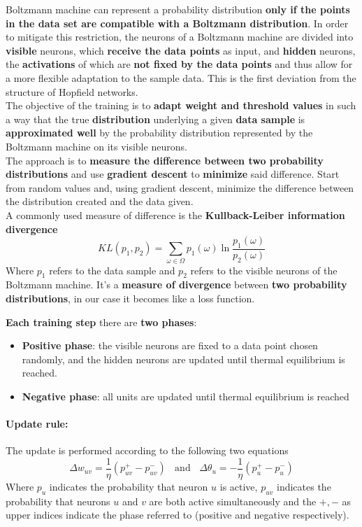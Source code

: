 Boltzmann machine can represent a probability distribution \textbf{only if the points in the data set are compatible with a Boltzmann distribution}. In order to mitigate this restriction, the neurons of a Boltzmann machine are divided into \textbf{visible} neurons, which \textbf{receive the data points} as input, and \textbf{hidden} neurons, the \textbf{activations} of which are \textbf{not fixed by the data points} and thus allow for a more flexible adaptation to the sample data. This is the first deviation from the structure of Hopfield networks.\\

The objective of the training is to \textbf{adapt weight and threshold values} in such a way that the true \textbf{distribution} underlying a given \textbf{data sample} is \textbf{approximated well} by the probability distribution represented by the Boltzmann machine on its visible neurons.\\

The approach is to \textbf{measure the difference between two probability distributions} and use \textbf{gradient descent} to \textbf{minimize} said difference. Start from random values and, using gradient descent, minimize the difference between the distribution created and the data given.\\

A commonly used measure of difference is the \textbf{Kullback-Leiber information divergence}
$$ KL(p_1, p_2) = \sum_{\omega \in \Omega} p_1 (\omega) \ln \frac{p_1(\omega)}{p_2 (\omega)} $$
Where $p_1$ refers to the data sample and $p_2$ refers to the visible neurons of the Boltzmann machine. It's a \textbf{measure of divergence} between \textbf{two probability distributions}, in our case it becomes like a loss function.\\

\newpage

\textbf{Each training step} there are \textbf{two phases}:
\begin{itemize}
	\item \textbf{Positive phase}: the visible neurons are fixed to a data point chosen randomly, and the hidden neurons are updated until thermal equilibrium is reached.\\
	
	\item \textbf{Negative phase}: all units are updated until thermal equilibrium is reached
\end{itemize}

\paragraph{Update rule:} The update is performed according to the following two equations
$$ \Delta w_{uv} = \frac{1}{\eta} \left(p_{uv}^+ - p_{uv}^-\right) \;\; \text{ and } \;\; \Delta \theta_u = - \frac{1}{\eta} \left(p_u^+ - p_u^-\right) $$
Where $p_u$ indicates the probability that neuron $u$ is active, $p_{uv}$ indicates the probability that neurons $u$ and $v$ are both active simultaneously and the $+, -$ as upper indices indicate the phase referred to (positive and negative respectively).\\

